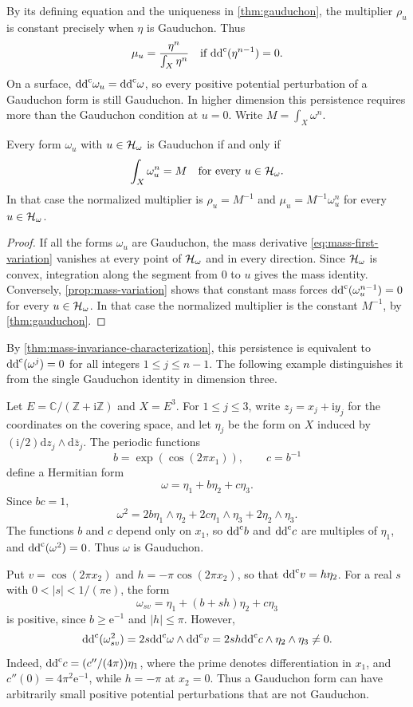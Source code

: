By its defining equation and the uniqueness in \cref{thm:gauduchon}, the multiplier $\rho_u$ is constant precisely when $\eta$ is Gauduchon. Thus
\[
 \mu_u=\frac{\eta^n}{\int_X\eta^n}
 \quad\text{if }\mathrm{dd}^{\mathrm{c}}(\eta^{n-1})=0.
\]
On a surface, $\mathrm{dd}^{\mathrm{c}}\omega_u=\mathrm{dd}^{\mathrm{c}}\omega$, so every positive potential perturbation of a Gauduchon form is still Gauduchon. In higher dimension this persistence requires more than the Gauduchon condition at $u=0$. Write $M=\int_X\omega^n$.

\begin{proposition}\label{prop:gauduchon-potential-persistence}
Every form $\omega_u$ with $u\in\mathcal H_\omega$ is Gauduchon if and only if
\[
 \int_X\omega_u^n=M
 \quad\text{for every }u\in\mathcal H_\omega.
\]
In that case the normalized multiplier is $\rho_u=M^{-1}$ and $\mu_u=M^{-1}\omega_u^n$ for every $u\in\mathcal H_\omega$.
\end{proposition}
\begin{proof}
If all the forms $\omega_u$ are Gauduchon, the mass derivative \eqref{eq:mass-first-variation} vanishes at every point of $\mathcal H_\omega$ and in every direction. Since $\mathcal H_\omega$ is convex, integration along the segment from $0$ to $u$ gives the mass identity. Conversely, \cref{prop:mass-variation} shows that constant mass forces $\mathrm{dd}^{\mathrm{c}}(\omega_u^{n-1})=0$ for every $u\in\mathcal H_\omega$. In that case the normalized multiplier is the constant $M^{-1}$, by \cref{thm:gauduchon}.
\end{proof}

By \cref{thm:mass-invariance-characterization}, this persistence is equivalent to $\mathrm{dd}^{\mathrm{c}}(\omega^j)=0$ for all integers $1\leq j\leq n-1$. The following example distinguishes it from the single Gauduchon identity in dimension three.

\begin{example}\label{ex:gauduchon-persistence-torus}
Let $E=\mathbb C/(\mathbb Z+\mathrm i\mathbb Z)$ and $X=E^3$. For $1\leq j\leq3$, write $z_j=x_j+\mathrm i y_j$ for the coordinates on the covering space, and let $\eta_j$ be the form on $X$ induced by $(\mathrm i/2)\mathrm dz_j\wedge\mathrm d\bar z_j$. The periodic functions
\[
 b=\exp(\cos(2\pi x_1)),\qquad c=b^{-1}
\]
define a Hermitian form
\[
 \omega=\eta_1+b\eta_2+c\eta_3.
\]
Since $bc=1$,
\[
 \omega^2=2b\eta_1\wedge\eta_2
          +2c\eta_1\wedge\eta_3+2\eta_2\wedge\eta_3.
\]
The functions $b$ and $c$ depend only on $x_1$, so $\mathrm{dd}^{\mathrm{c}} b$ and $\mathrm{dd}^{\mathrm{c}} c$ are multiples of $\eta_1$, and $\mathrm{dd}^{\mathrm{c}}(\omega^2)=0$. Thus $\omega$ is Gauduchon.

Put $v=\cos(2\pi x_2)$ and $h=-\pi\cos(2\pi x_2)$, so that $\mathrm{dd}^{\mathrm{c}} v=h\eta_2$. For a real $s$ with $0<|s|<1/(\pi\mathrm e)$, the form
\[
 \omega_{sv}=\eta_1+(b+sh)\eta_2+c\eta_3
\]
is positive, since $b\geq\mathrm e^{-1}$ and $|h|\leq\pi$. However,
\[
 \mathrm{dd}^{\mathrm{c}}(\omega_{sv}^2)
 =2s\mathrm{dd}^{\mathrm{c}}\omega\wedge\mathrm{dd}^{\mathrm{c}} v
 =2sh\mathrm{dd}^{\mathrm{c}} c\wedge\eta_2\wedge\eta_3\ne0.
\]
Indeed, $\mathrm{dd}^{\mathrm{c}} c=(c''/(4\pi))\eta_1$, where the prime denotes differentiation in $x_1$, and $c''(0)=4\pi^2\mathrm e^{-1}$, while $h=-\pi$ at $x_2=0$. Thus a Gauduchon form can have arbitrarily small positive potential perturbations that are not Gauduchon.
\end{example}

